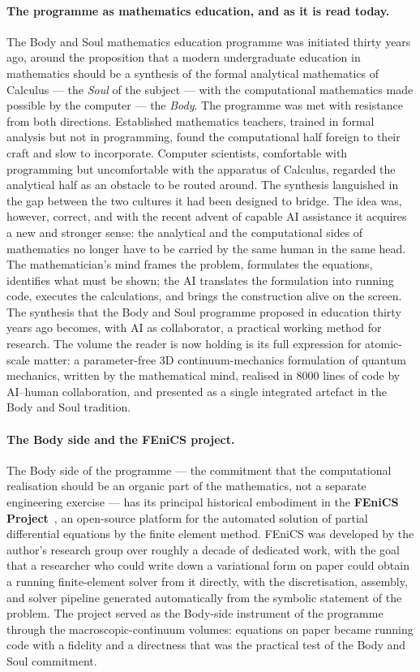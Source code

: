 \paragraph{The programme as mathematics education, and as it is read today.}
The Body and Soul mathematics education programme was initiated thirty years ago, around the proposition that a modern undergraduate education in mathematics should be a synthesis of the formal analytical mathematics of Calculus --- the \emph{Soul} of the subject --- with the computational mathematics made possible by the computer --- the \emph{Body}. The programme was met with resistance from both directions. Established mathematics teachers, trained in formal analysis but not in programming, found the computational half foreign to their craft and slow to incorporate. Computer scientists, comfortable with programming but uncomfortable with the apparatus of Calculus, regarded the analytical half as an obstacle to be routed around. The synthesis languished in the gap between the two cultures it had been designed to bridge. The idea was, however, correct, and with the recent advent of capable AI assistance it acquires a new and stronger sense: the analytical and the computational sides of mathematics no longer have to be carried by the same human in the same head. The mathematician's mind frames the problem, formulates the equations, identifies what must be shown; the AI translates the formulation into running code, executes the calculations, and brings the construction alive on the screen. The synthesis that the Body and Soul programme proposed in education thirty years ago becomes, with AI as collaborator, a practical working method for research. The volume the reader is now holding is its full expression for atomic-scale matter: a parameter-free 3D continuum-mechanics formulation of quantum mechanics, written by the mathematical mind, realised in 8000 lines of code by AI--human collaboration, and presented as a single integrated artefact in the Body and Soul tradition.

\paragraph{The Body side and the FEniCS project.}
The Body side of the programme --- the commitment that the computational realisation should be an organic part of the mathematics, not a separate engineering exercise --- has its principal historical embodiment in the \textbf{FEniCS Project}~\cite{FEniCS2012,FEniCSProject}, an open-source platform for the automated solution of partial differential equations by the finite element method. FEniCS was developed by the author's research group over roughly a decade of dedicated work, with the goal that a researcher who could write down a variational form on paper could obtain a running finite-element solver from it directly, with the discretisation, assembly, and solver pipeline generated automatically from the symbolic statement of the problem. The project served as the Body-side instrument of the programme through the macroscopic-continuum volumes: equations on paper became running code with a fidelity and a directness that was the practical test of the Body and Soul commitment.

